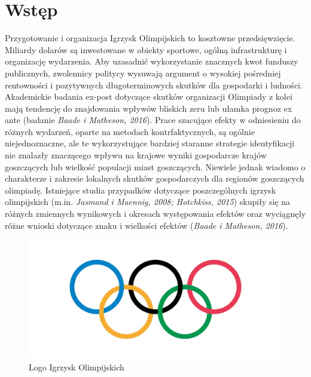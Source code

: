 \documentclass[12pt]{article}
\begin{document}
    
\newpage
\section{Wstęp}        
Przygotowanie i organizacja Igrzysk Olimpijskich to kosztowne przedsięwzięcie. Miliardy dolarów są inwestowane w obiekty sportowe, ogólną infrastrukturę i organizację wydarzenia. Aby uzasadnić wykorzystanie znacznych kwot funduszy publicznych, zwolennicy politycy wysuwają argument o wysokiej pośredniej rentowności i pozytywnych długoterminowych skutków dla gospodarki i ludności. Akademickie badania ex-post dotyczące skutków organizacji Olimpiady z kolei mają tendencję do znajdowania wpływów bliskich zeru lub ułamka prognoz ex ante (badanie \textit{Baade i Matheson, 2016}). 
Prace szacujące efekty w odniesieniu do różnych wydarzeń, oparte na metodach kontrfaktycznych, są ogólnie niejednoznaczne, ale te wykorzystujące bardziej staranne strategie identyfikacji nie znalazły znaczącego wpływu na krajowe wyniki gospodarcze krajów goszczących lub wielkość populacji miast goszczących. Niewiele jednak wiadomo o charakterze i zakresie lokalnych skutków gospodarczych dla regionów goszczących olimpiadę. Istniejące studia przypadków dotyczące poszczególnych igrzysk olimpijskich (m.in. \textit{Jasmand i Maennig, 2008; Hotchkiss, 2015}) skupiły się na różnych zmiennych wynikowych i okresach występowania efektów oraz wyciągnęły różne wnioski dotyczące znaku i wielkości efektów (\textit{Baade i Matheson, 2016}).

\begin{figure}[ht]
    \centering
    \includegraphics[scale = 0.3]{img/olympics_logo}
    \caption{Logo Igrzysk Olimpijskich}
    \label{fig:logo}
\end{figure}
\end{document}
